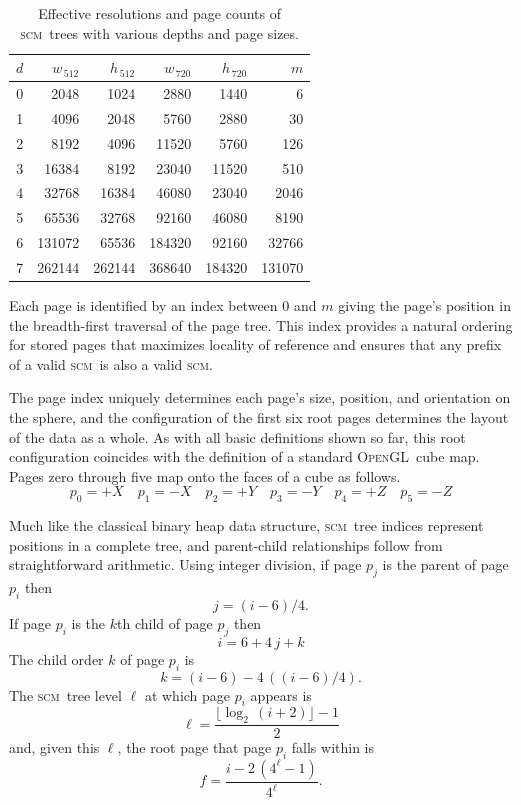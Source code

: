 \documentclass[oneside,10pt]{memoir}
\newcommand{\opengl}  {\textsc{OpenGL}}
\newcommand{\scm}     {\textsc{scm}}
\newcommand{\B}{\bigstrut[b]}
\newcommand{\T}{\bigstrut[t]}
\begin{document}
\begin{Spacing}{1.1}
\begin{table}
  \centering
  \label{tab:resolution}
  \begin{tabular}{r|rr|rr|r}
  $d$& $w_{\,512}$& $h_{\,512}$& $w_{\,720}$& $h_{\,720}$& $m$ \B\\\hline
  \num{0}&  \num{2048}&  \num{1024}&  \num{2880}&  \num{1440}&     \num{6} \T\\
  \num{1}&  \num{4096}&  \num{2048}&  \num{5760}&  \num{2880}&    \num{30} \\
  \num{2}&  \num{8192}&  \num{4096}& \num{11520}&  \num{5760}&   \num{126} \\
  \num{3}& \num{16384}&  \num{8192}& \num{23040}& \num{11520}&   \num{510} \\
  \num{4}& \num{32768}& \num{16384}& \num{46080}& \num{23040}&  \num{2046} \\
  \num{5}& \num{65536}& \num{32768}& \num{92160}& \num{46080}&  \num{8190} \\
  \num{6}&\num{131072}& \num{65536}&\num{184320}& \num{92160}& \num{32766} \\
  \num{7}&\num{262144}&\num{262144}&\num{368640}&\num{184320}&\num{131070} \\
  \end{tabular}
  \caption{Effective resolutions and page counts of \scm\ trees with various depths and page sizes.}
\end{table}

Each page is identified by an index between $0$ and $m$ giving the page's position in the breadth-first traversal of the page tree. This index provides a natural ordering for stored pages that maximizes locality of reference and ensures that any prefix of a valid \scm\ is also a valid \scm.

The page index uniquely determines each page's size, position, and orientation on the sphere, and the configuration of the first six root pages determines the layout of the data as a whole. As with all basic definitions shown so far, this root configuration coincides with the definition of a standard \opengl\ cube map. Pages zero through five map onto the faces of a cube as follows.
\[p_0=+X\quad p_1=-X\quad p_2=+Y\quad p_3=-Y\quad p_4=+Z\quad p_5=-Z\]

Much like the classical binary heap data structure, \scm\ tree indices represent positions in a complete tree, and parent-child relationships follow from straightforward arithmetic. Using integer division, if page $p_j$ is the parent of page $p_i$ then
\[j=(i-6)/4.\]
If page $p_i$ is the $k$th child of page $p_j$ then
\[i=6+4\,j+k\]
The child order $k$ of page $p_i$ is
\[k=(i-6)-4\,((i-6)/4).\]
The \scm\ tree level $\ell$ at which page $p_i$ appears is
\[\ell=\frac{\lfloor\log_2\,(i+2)\rfloor - 1}{2}\]
and, given this $\ell$, the root page that page $p_i$ falls within is
\[f=\frac{i - 2\,(4^\ell - 1)}{4^\ell}.\]


\end{Spacing}
\end{document}
